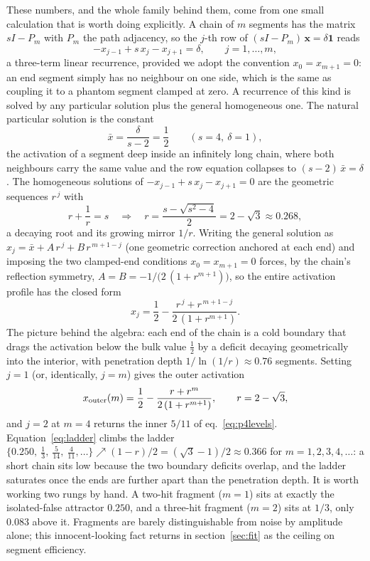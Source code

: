 \documentclass[11pt,a4paper]{article}
\begin{document}
These numbers, and the whole family behind them, come from one small
calculation that is worth doing explicitly. A chain of $m$ segments
has the matrix $sI-P_m$ with $P_m$ the path adjacency, so the $j$-th
row of $(sI-P_m)\,\mathbf{x}=\delta\mathbf{1}$ reads
\[
-x_{j-1}+s\,x_j-x_{j+1}=\delta ,\qquad j=1,\dots,m ,
\]
a three-term linear recurrence, provided we adopt the convention
$x_0=x_{m+1}=0$: an end segment simply has no neighbour on one side,
which is the same as coupling it to a phantom segment clamped at
zero. A recurrence of this kind is solved by any particular solution
plus the general homogeneous one. The natural particular solution is
the constant
\[
\bar x=\frac{\delta}{s-2}=\frac12 \qquad (s=4,\ \delta=1),
\]
the activation of a segment deep inside an infinitely long chain,
where both neighbours carry the same value and the row equation
collapses to $(s-2)\,\bar x=\delta$. The homogeneous solutions of
$-x_{j-1}+s\,x_j-x_{j+1}=0$ are the geometric sequences $r^{\,j}$
with
\[
r+\frac{1}{r}=s
\quad\Longrightarrow\quad
r=\frac{s-\sqrt{s^{2}-4}}{2}=2-\sqrt3\approx0.268 ,
\]
a decaying root and its growing mirror $1/r$. Writing the general
solution as $x_j=\bar x+A\,r^{\,j}+B\,r^{\,m+1-j}$ (one geometric
correction anchored at each end) and imposing the two clamped-end
conditions $x_0=x_{m+1}=0$ forces, by the chain's reflection
symmetry, $A=B=-1/\big(2\,(1+r^{m+1})\big)$, so the entire
activation profile has the closed form
\[
x_j=\frac12-\frac{r^{\,j}+r^{\,m+1-j}}{2\,(1+r^{m+1})} .
\]
The picture behind the algebra: each end of the chain is a cold
boundary that drags the activation below the bulk value $\tfrac12$
by a deficit decaying geometrically into the interior, with
penetration depth $1/\ln(1/r)\approx0.76$ segments. Setting $j=1$
(or, identically, $j=m$) gives the outer activation
\begin{equation}
x_{\rm outer}(m)=\frac12-\frac{r+r^{m}}{2\,(1+r^{m+1})},
\qquad r=2-\sqrt3,
\label{eq:ladder}
\end{equation}
and $j=2$ at $m=4$ returns the inner $5/11$ of
eq.~\eqref{eq:p4levels}. Equation~\eqref{eq:ladder} climbs the ladder
$\{0.250,\ \tfrac13,\ \tfrac{5}{14},\
\tfrac{4}{11},\dots\}\nearrow(1-r)/2=(\sqrt3-1)/2\approx0.366$ for
$m=1,2,3,4,\dots$: a short chain sits low because the two boundary
deficits overlap, and the ladder saturates once the ends are further
apart than the penetration depth. It is worth
working two rungs by hand. A two-hit fragment ($m{=}1$) sits at exactly
the isolated-false attractor $0.250$, and a three-hit fragment ($m{=}2$)
sits at $1/3$, only $0.083$ above it. Fragments are barely
distinguishable from noise by amplitude alone; this innocent-looking
fact returns in section~\ref{sec:fit} as the ceiling on segment
efficiency.
\end{document}
